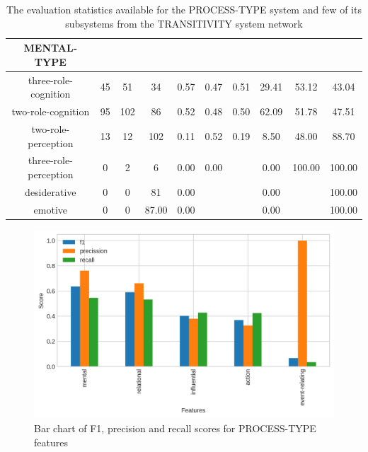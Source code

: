\begin{table}[!ht]
{\begin{tabular}{|c|c|c|c|c|c|c|c|c|c|}
            MENTAL-TYPE &  &  &  &  &  &  &  &  &  \\ \hline
            three-role-cognition & 45 & 51 & 34 & 0.57 & 0.47 & 0.51 & 29.41 & 53.12 & 43.04 \\ \hline
            two-role-cognition & 95 & 102 & 86 & 0.52 & 0.48 & 0.50 & 62.09 & 51.78 & 47.51 \\ \hline
            two-role-perception & 13 & 12 & 102 & 0.11 & 0.52 & 0.19 & 8.50 & 48.00 & 88.70 \\ \hline
            three-role-perception & 0 & 2 & 6 & 0.00 & 0.00 &  & 0.00 & 100.00 & 100.00 \\ \hline
            desiderative & 0 & 0 & 81 & 0.00 &  &  & 0.00 &  & 100.00 \\ \hline
            emotive & 0 & 0 & 87.00 & 0.00 &  &  & 0.00 &  & 100.00 \\ \hline
        \end{tabular}
        }
        \caption{The evaluation statistics available for the PROCESS-TYPE system and few of its subsystems from the TRANSITIVITY system network}
        \label{tab:features-transitivity}
    \end{table}

    \begin{figure}[!ht]
        \centering
        \includegraphics[width=.65\textwidth]{evaluation-results/figures/accuracy-semantic-process-type-f1}
        \caption{Bar chart of F1, precision and recall scores for PROCESS-TYPE features}
        \label{fig:process-types}
    \end{figure}
    
